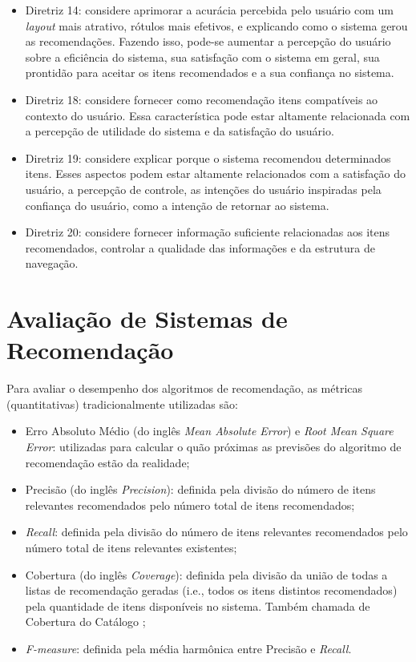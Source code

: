 \begin{itemize}
\item Diretriz 14: considere aprimorar a acurácia percebida pelo usuário com um \textit{layout} mais atrativo, rótulos mais
efetivos, e explicando como o sistema gerou as recomendações. Fazendo isso, pode-se aumentar a percepção do usuário sobre a
eficiência do sistema, sua satisfação com o sistema em geral, sua prontidão para aceitar os itens recomendados e a sua
confiança no sistema.
\item Diretriz 18: considere fornecer como recomendação itens compatíveis ao contexto do usuário. Essa característica
pode estar altamente relacionada com a percepção de utilidade do sistema e da satisfação do usuário.
\item Diretriz 19: considere explicar porque o sistema recomendou determinados itens. Esses aspectos podem estar
altamente relacionados com a satisfação do usuário, a percepção de controle, as intenções do usuário inspiradas pela
confiança do usuário, como a intenção de retornar ao sistema.
\item Diretriz 20: considere fornecer informação suficiente relacionadas aos itens recomendados, controlar a qualidade
das informações e da estrutura de navegação.
\end{itemize}

\section{Avaliação de Sistemas de Recomendação}\label{section:fundamentacao-avaliacao-sr}

Para avaliar o desempenho dos algoritmos de recomendação, as métricas (quantitativas) tradicionalmente utilizadas são:

\begin{itemize}
\item Erro Absoluto Médio (do inglês \textit{Mean Absolute Error}) e \textit{Root Mean Square Error}: utilizadas
para calcular o quão próximas as previsões do algoritmo de recomendação estão da realidade;
\item Precisão (do inglês \textit{Precision}): definida pela divisão do número de itens relevantes recomendados pelo número total de itens recomendados;
\item \textit{Recall}: definida pela divisão do número de itens relevantes recomendados pelo número total de itens
relevantes existentes;
\item Cobertura (do inglês \textit{Coverage}): definida pela divisão da união de todas a listas de recomendação geradas (i.e., todos os itens
distintos recomendados) pela quantidade de itens disponíveis no sistema. Também chamada de Cobertura do Catálogo \cite{ge2010beyond};
\item \textit{F-measure}: definida pela média harmônica entre Precisão e \textit{Recall}.
\end{itemize}

